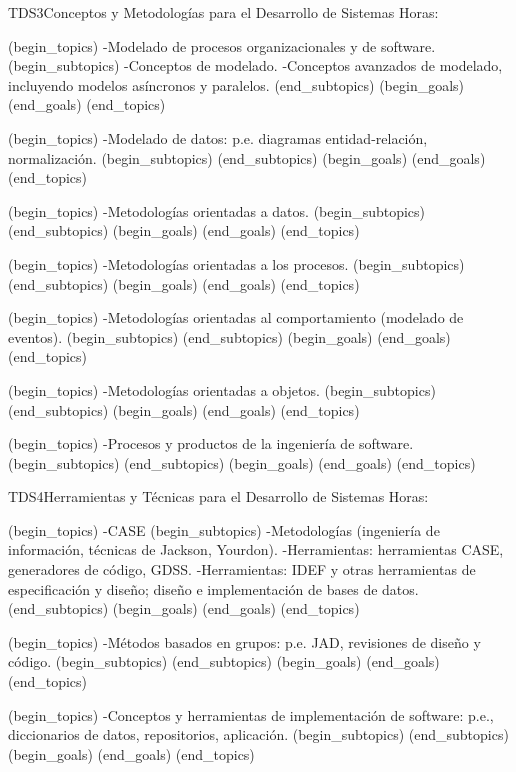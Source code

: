 \begin{BKL2}{TDS3}{Conceptos y Metodologías para el Desarrollo de Sistemas}
Horas:
 
(begin_topics)
-Modelado de procesos organizacionales y de software.
(begin_subtopics)
-Conceptos de modelado.
-Conceptos avanzados de modelado, incluyendo modelos asíncronos y paralelos.
(end_subtopics)
(begin_goals)
(end_goals)
(end_topics)

 
(begin_topics)
-Modelado de datos: p.e. diagramas entidad-relación, normalización.
(begin_subtopics)
(end_subtopics)
(begin_goals)
(end_goals)
(end_topics)

 
(begin_topics)
-Metodologías orientadas a datos.
(begin_subtopics)
(end_subtopics)
(begin_goals)
(end_goals)
(end_topics)

 
(begin_topics)
-Metodologías orientadas a los procesos.
(begin_subtopics)
(end_subtopics)
(begin_goals)
(end_goals)
(end_topics)

 
(begin_topics)
-Metodologías orientadas al comportamiento (modelado de eventos).
(begin_subtopics)
(end_subtopics)
(begin_goals)
(end_goals)
(end_topics)

 

(begin_topics)
-Metodologías orientadas a objetos.
(begin_subtopics)
(end_subtopics)
(begin_goals)
(end_goals)
(end_topics)

 
(begin_topics)
-Procesos y productos de la ingeniería de software.
(begin_subtopics)
(end_subtopics)
(begin_goals)
(end_goals)
(end_topics)

\end{BKL2}



\begin{BKL2}{TDS4}{Herramientas y Técnicas para el Desarrollo de Sistemas}
Horas:
 
(begin_topics)
-CASE
(begin_subtopics)
-Metodologías (ingeniería de información, técnicas de Jackson, Yourdon).
-Herramientas: herramientas CASE, generadores de código, GDSS.
-Herramientas: IDEF y otras herramientas de especificación y diseño; diseño e implementación de bases de datos.
(end_subtopics)
(begin_goals)
(end_goals)
(end_topics)

 
(begin_topics)
-Métodos basados en grupos: p.e. JAD, revisiones de diseño y código.
(begin_subtopics)
(end_subtopics)
(begin_goals)
(end_goals)
(end_topics)

 
(begin_topics)
-Conceptos y herramientas de implementación de software: p.e., diccionarios de datos, repositorios, aplicación.
(begin_subtopics)
(end_subtopics)
(begin_goals)
(end_goals)
(end_topics)

\end{BKL2}



